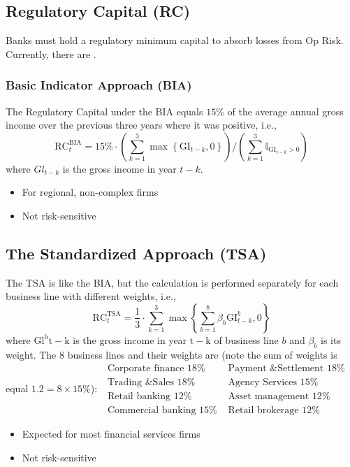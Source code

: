 \subsection*{Regulatory Capital (RC)}
Banks must hold a regulatory minimum capital to absorb losses from Op Risk. Currently, there are .

\subsubsection*{Basic Indicator Approach (BIA)}
The Regulatory Capital under the BIA equals $15 \%$ of the average annual gross income over the previous three years where it was positive, i.e.,
$$
\mathrm{RC}_{t}^{\mathrm{BIA}}=15 \% \cdot\left(\sum_{k=1}^{3} \max \left\{\mathrm{GI}_{t-k}, 0\right\}\right) /\left(\sum_{k=1}^{3} \mathbb{I}_{\mathrm{GI}_{t-k}>0}\right)
$$
where $G l_{t-k}$ is the gross income in year $t-k$.
\begin{itemize}[leftmargin=*]
    \item For regional, non-complex firms
    \item Not risk-sensitive
\end{itemize}






\subsection*{The Standardized Approach (TSA)}
The TSA is like the BIA, but the calculation is performed separately for each business line with different weights, i.e.,
$$
\mathrm{RC}_{t}^{\mathrm{TSA}}=\frac{1}{3} \cdot \sum_{k=1}^{3} \max \left\{\sum_{b=1}^{8} \beta_{b} \mathrm{GI}_{t-k}^{b}, 0\right\}
$$
where $\mathrm{Gl}^{\mathrm{b}} \mathrm{t-k}$ is the gross income in year $\mathrm{t}-\mathrm{k}$ of business line $b$ and $\beta_{b}$ is its weight. The 8 business lines and their weights are (note the sum of weights is equal $1.2=8 \times 15 \%$):
$\begin{array}{ll}\text { Corporate finance } 18 \% & \text { Payment \& Settlement } 18 \% \\ \text { Trading \& Sales } 18 \% & \text { Agency Services } 15 \% \\ \text { Retail banking } 12 \% & \text { Asset management } 12 \% \\ \text { Commercial banking } 15 \% & \text { Retail brokerage } 12 \%\end{array}$
\begin{itemize}[leftmargin=*]
    \item Expected for most financial services firms
    \item Not risk-sensitive
\end{itemize}



